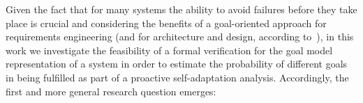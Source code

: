 Given the fact that for many systems the ability to avoid failures before they take place is crucial and considering the benefits of a goal-oriented approach for requirements engineering (and for architecture and design, according to~\cite{Bresciani:2004}), in this work we investigate the feasibility of a formal verification for the goal model representation of a system in order to estimate the probability of different goals in being fulfilled as part of a proactive self-adaptation analysis. Accordingly, the first and more general research question emerges:


\bigskip

\setlength{\fboxsep}{10pt}
\noindent{}\bigskip












